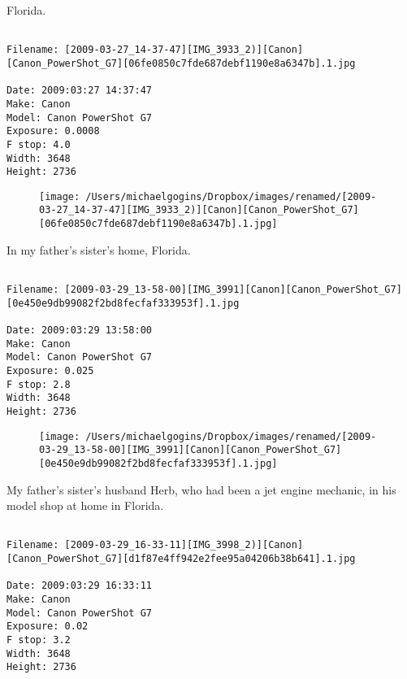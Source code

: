 \clearpage
\onecolumn
\noindent Florida.
\noindent
\begin{lstlisting}

Filename: [2009-03-27_14-37-47][IMG_3933_2)][Canon][Canon_PowerShot_G7][06fe0850c7fde687debf1190e8a6347b].1.jpg

Date: 2009:03:27 14:37:47
Make: Canon
Model: Canon PowerShot G7
Exposure: 0.0008
F stop: 4.0
Width: 3648
Height: 2736
\end{lstlisting}
\clearpage

\begin{figure}
\texttt{[image: /Users/michaelgogins/Dropbox/images/renamed/[2009-03-27\_14-37-47][IMG\_3933\_2)][Canon][Canon\_PowerShot\_G7][06fe0850c7fde687debf1190e8a6347b].1.jpg]}
\end{figure}
    
\clearpage
\onecolumn
\noindent In my father's sister's home, Florida.
\noindent
\begin{lstlisting}

Filename: [2009-03-29_13-58-00][IMG_3991][Canon][Canon_PowerShot_G7][0e450e9db99082f2bd8fecfaf333953f].1.jpg

Date: 2009:03:29 13:58:00
Make: Canon
Model: Canon PowerShot G7
Exposure: 0.025
F stop: 2.8
Width: 3648
Height: 2736
\end{lstlisting}
\clearpage

\begin{figure}
\texttt{[image: /Users/michaelgogins/Dropbox/images/renamed/[2009-03-29\_13-58-00][IMG\_3991][Canon][Canon\_PowerShot\_G7][0e450e9db99082f2bd8fecfaf333953f].1.jpg]}
\end{figure}
    
\clearpage
\onecolumn
\noindent My father's sister's husband Herb, who had been a jet engine mechanic, in his model shop at home in Florida.
\noindent
\begin{lstlisting}

Filename: [2009-03-29_16-33-11][IMG_3998_2)][Canon][Canon_PowerShot_G7][d1f87e4ff942e2fee95a04206b38b641].1.jpg

Date: 2009:03:29 16:33:11
Make: Canon
Model: Canon PowerShot G7
Exposure: 0.02
F stop: 3.2
Width: 3648
Height: 2736
\end{lstlisting}
\clearpage

